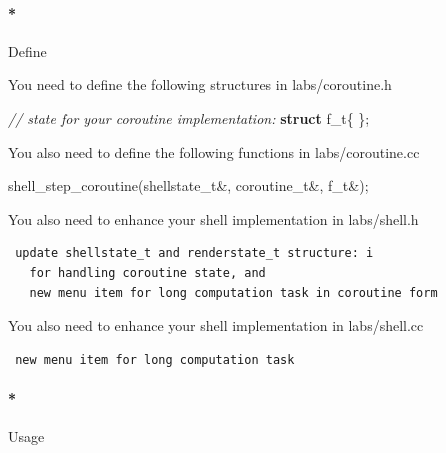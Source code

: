 \documentclass[]{article}
\newenvironment{Shaded}{}{}
\newcommand{\KeywordTok}[1]{\textbf{{#1}}}
\newcommand{\CommentTok}[1]{\textcolor[rgb]{0.50,0.50,0.50}{\textit{{#1}}}}
\newcommand{\NormalTok}[1]{{#1}}
\let\oldparagraph\paragraph
\renewcommand{\paragraph}[1]{\oldparagraph{#1}\mbox{}}
\begin{document}
\paragraph*{Define}\label{define-4}

You need to define the following structures in labs/coroutine.h

\begin{Shaded}
\begin{Highlighting}[]
   \CommentTok{// state for your coroutine implementation:}
   \KeywordTok{struct} \NormalTok{f_t\{}
   \NormalTok{\};}
\end{Highlighting}
\end{Shaded}

You also need to define the following functions in labs/coroutine.cc

\begin{Shaded}
\begin{Highlighting}[]
   \NormalTok{shell_step_coroutine(shellstate_t&, coroutine_t&, f_t&);}
\end{Highlighting}
\end{Shaded}

You also need to enhance your shell implementation in labs/shell.h

\begin{verbatim}
 update shellstate_t and renderstate_t structure: i
   for handling coroutine state, and
   new menu item for long computation task in coroutine form
\end{verbatim}

You also need to enhance your shell implementation in labs/shell.cc

\begin{verbatim}
 new menu item for long computation task
\end{verbatim}

\paragraph*{Usage}\label{usage-4}
\end{document}
